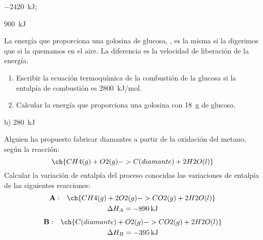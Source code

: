   \begin{solution}
    \begin{enumerate*}
      \item \SI{-2420}{\kilo\joule}; \item \SI{900}{\kilo\joule}
    \end{enumerate*}
  \end{solution}









  \begin{exercise}[
      tags    = {termodinámica, entalpía, entalpia de reacción, calor},
      topics  = {química, termoquímica, termodinámica},
      source  = {},
    ]
    La energía que proporciona una golosina de glucosa, , es la misma si la digerimos que si la quemamos en el aire. La diferencia es la velocidad de liberación de la energía.
    \begin{enumerate}
      \item Escribir la ecuación termoquímica de la combustión de la glucosa si la entalpía de combustión es \SI{2800}{kJ/mol}.
      \item Calcular la energía que proporciona una golosina con \SI{18}{\gram} de glucosa.
    \end{enumerate}
  \end{exercise}

  \begin{solution}
    b) \SI{280}{\kilo\joule}
  \end{solution}




  \begin{exercise}[
      tags    = {termodinámica, entalpía, ley de Hess},
      topics  = {química, termoquímica, termodinámica},
      source  = {},
    ]
    Alguien ha propuesto fabricar diamantes a partir de la oxidación del metano, según la reacción:
    \[ \ch{CH4(g) + O2(g) -> C(diamante) + 2 H2O(l)}  \]
    Calcular la variación de entalpía del proceso conocidas las variaciones de entalpía de las siguientes reacciones:
    \begin{multline*}
      \mathbf{A:}\quad\ch{CH4(g) + 2 O2(g) -> CO2(g) + 2 H2O(l)} \\
        \Delta H_A = \SI{-890}{\kilo\joule}
    \end{multline*}
    \begin{multline*}
      \mathbf{B:}\quad\ch{C(diamante) + O2(g) -> CO2(g) + 2 H2O(l)} \\
        \Delta H_B = \SI{-395}{\kilo\joule}
    \end{multline*}


  \end{exercise}

